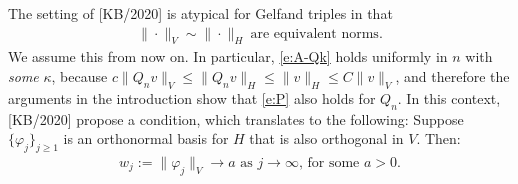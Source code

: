 \documentclass[12pt]{article}
\newcommand{\norm}[2]{\|#1\|_{#2}}
\newcommand{\from}{\colon}
\begin{document}
	
	The setting of [KB/2020]
	is atypical for Gelfand triples
	in that 
	\begin{align}
		\norm{\cdot}{V} \sim \norm{\cdot}{H}
		\ 
		\text{are equivalent norms}
		.
	\end{align}
	We assume this from now on.
	In particular,
	\eqref{e:A-Qk}
	holds uniformly in $n$ with \emph{some} $\kappa$,
	because
	$c \norm{Q_n v}{V} \leq \norm{Q_n v}{H} \leq \norm{v}{H} \leq C \norm{v}{V}$,
	and therefore the arguments in the introduction show that
	\eqref{e:P} also holds for $Q_n$.
	In this context, [KB/2020]
	propose a condition,
	which translates to the following:
	Suppose $\{ \varphi_j \}_{j \geq 1}$
	is an orthonormal basis for $H$
	that is also orthogonal in $V$.
	Then:
	\begin{align}
		\label{e:III}
		\text{
			$w_j := \norm{\varphi_j}{V} \to a$ as $j \to \infty$,
			for some $a > 0$.
		}
	\end{align}

	
\end{document}

